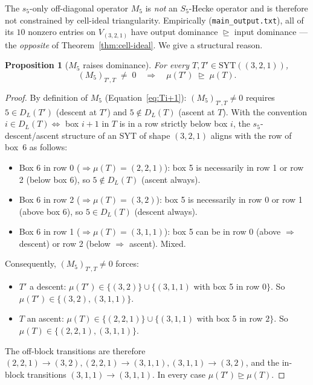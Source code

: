 \documentclass[11pt]{article}
\newtheorem{proposition}[theorem]{Proposition}
\theoremstyle{definition}
\begin{document}
The $s_5$-only off-diagonal operator $M_5$ is \emph{not} an $S_5$-Hecke operator and is therefore not constrained by cell-ideal triangularity. Empirically (\texttt{main\_output.txt}), all of its $10$ nonzero entries on $V_{(3,2,1)}$ have output dominance $\trianglerighteq$ input dominance --- the \emph{opposite} of Theorem~\ref{thm:cell-ideal}. We give a structural reason.

\begin{proposition}[$M_5$ raises dominance]\label{prop:M5}
For every $T, T' \in \mathrm{SYT}((3,2,1))$,
\[
(M_5)_{T', T} \;\neq\; 0 \quad \Longrightarrow \quad \mu(T') \;\trianglerighteq\; \mu(T).
\]
\end{proposition}

\begin{proof}
By definition of $M_5$ (Equation~\eqref{eq:Ti+1}): $(M_5)_{T', T} \neq 0$ requires $5 \in D_L(T')$ (descent at $T'$) and $5 \notin D_L(T)$ (ascent at $T$). With the convention $i \in D_L(T) \Leftrightarrow$ box $i+1$ in $T$ is in a row strictly below box $i$, the $s_5$-descent/ascent structure of an SYT of shape $(3,2,1)$ aligns with the row of box~6 as follows:
\begin{itemize}[leftmargin=2em,topsep=0.1em,itemsep=0.1em]
\item Box 6 in row 0 ($\Rightarrow \mu(T) = (2,2,1)$): box 5 is necessarily in row 1 or row 2 (below box 6), so $5 \notin D_L(T)$ (ascent always).
\item Box 6 in row 2 ($\Rightarrow \mu(T) = (3,2)$): box 5 is necessarily in row 0 or row 1 (above box 6), so $5 \in D_L(T)$ (descent always).
\item Box 6 in row 1 ($\Rightarrow \mu(T) = (3,1,1)$): box 5 can be in row 0 (above $\Rightarrow$ descent) or row 2 (below $\Rightarrow$ ascent). Mixed.
\end{itemize}

Consequently, $(M_5)_{T', T} \neq 0$ forces:
\begin{itemize}[leftmargin=2em,topsep=0.1em,itemsep=0.1em]
\item $T'$ a descent: $\mu(T') \in \{(3,2)\} \cup \{(3,1,1)$ with box 5 in row $0\}$. So $\mu(T') \in \{(3,2), (3,1,1)\}$.
\item $T$ an ascent: $\mu(T) \in \{(2,2,1)\} \cup \{(3,1,1)$ with box 5 in row $2\}$. So $\mu(T) \in \{(2,2,1), (3,1,1)\}$.
\end{itemize}

The off-block transitions are therefore $(2,2,1) \to (3,2), (2,2,1) \to (3,1,1), (3,1,1) \to (3,2)$, and the in-block transitions $(3,1,1) \to (3,1,1)$. In every case $\mu(T') \trianglerighteq \mu(T)$. \qedhere
\end{proof}
\end{document}
